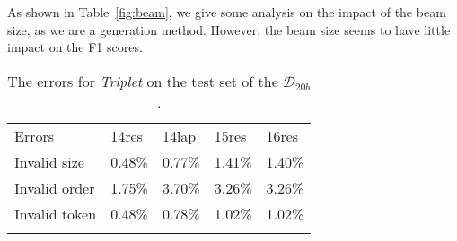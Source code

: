 \documentclass[11pt,a4paper]{article}
\begin{document}
As shown in Table~\ref{fig:beam}, we give some analysis on the impact of the beam size, as we are a generation method. However, the beam size seems to have little impact on the F1 scores. 




\begin{table}[h]
  \centering
  \setlength{\tabcolsep}{1pt} \renewcommand{\arraystretch}{1.3}
  \begin{tabular}{m{2.5cm}m{1.15cm}<{\centering}m{1.15cm}<{\centering}m{1.15cm}<{\centering}m{1.15cm}<{\centering}}
    \Xhline{0.08em}
  Errors               & 14res  & 14lap  & 15res  & 16res  \\
  \cline{1-5}
  Invalid size         & 0.48\% & 0.77\% & 1.41\% & 1.40\% \\
  Invalid order        & 1.75\% & 3.70\% & 3.26\% & 3.26\% \\
  Invalid token      & 0.48\% & 0.78\% & 1.02\% & 1.02\% \\
  \Xhline{0.08em}
  \end{tabular}
  \caption{The errors  for \emph{Triplet} on the test set of the \emph{$\mathcal{D}_{20b}$}.  }
  \label{tb:error}
  \end{table}
\end{document}
